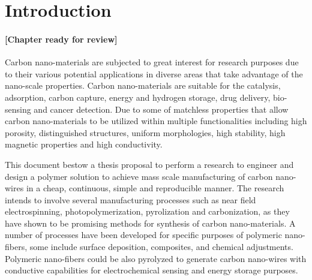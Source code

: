 
\chapter{Introduction} %

\label{Chapter:Introduction}

\subsubsection*{\color{mygray}[Chapter ready for review]}

Carbon nano-materials are subjected to great interest for research purposes due to their various potential applications in diverse areas that take advantage of the nano-scale properties. \cite{Siddiqui2019} Carbon nano-materials are suitable for the catalysis, adsorption, carbon capture, energy and hydrogen storage, drug delivery, bio-sensing and cancer detection. \cite{Siddiqui2019} Due to some of matchless properties that allow carbon nano-materials to be utilized within multiple functionalities including high porosity, distinguished structures, uniform morphologies, high stability, high magnetic properties and high conductivity. \cite{Siddiqui2019}

This document bestow a thesis proposal to perform a research to engineer and design a polymer solution to achieve mass scale manufacturing of carbon nano-wires in a cheap, continuous, simple and reproducible manner. The research intends to involve several manufacturing processes such as near field electrospinning, photopolymerization, pyrolization and carbonization, as they have shown to be promising methods for synthesis of carbon nano-materials. \cite{Cardenas2017} A number of processes have been developed for specific purposes of polymeric nano-fibers, some include surface deposition, composites, and chemical adjustments. Polymeric nano-fibers could be also pyrolyzed to generate carbon nano-wires with conductive capabilities \cite{Madou2011} for electrochemical sensing and energy storage purposes.

